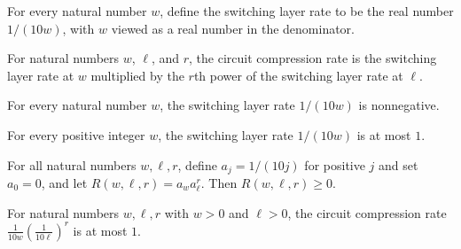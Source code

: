 \begin{definition}
\label{FABL.switchingLayerRate}
\leanok
For every natural number $w$, define the switching layer rate to be the real number
$1/(10w)$, with $w$ viewed as a real number in the denominator.
\end{definition}

\begin{definition}
\label{FABL.circuitCompressionRate}
\leanok
{}
For natural numbers $w$, $\ell$, and $r$, the circuit compression rate is the switching
layer rate at $w$ multiplied by the $r$th power of the switching layer rate at $\ell$.
\end{definition}

\begin{theorem}
\label{FABL.switchingLayerRate_nonneg}
\leanok
{}
For every natural number $w$, the switching layer rate $1/(10w)$ is nonnegative.
\end{theorem}

\begin{theorem}
\label{FABL.switchingLayerRate_le_one}
\leanok
{}
For every positive integer $w$, the switching layer rate $1/(10w)$ is at most $1$.
\end{theorem}

\begin{theorem}
\label{FABL.circuitCompressionRate_nonneg}
\leanok
{}
For all natural numbers $w,\ell,r$, define $a_j=1/(10j)$ for positive $j$ and set
$a_0=0$, and let $R(w,\ell,r)=a_w a_\ell^{r}$. Then $R(w,\ell,r)\geq 0$.
\end{theorem}

\begin{theorem}
\label{FABL.circuitCompressionRate_le_one}
\leanok
{}
For natural numbers $w,\ell,r$ with $w>0$ and $\ell>0$, the circuit compression rate
$\frac{1}{10w}\left(\frac{1}{10\ell}\right)^r$ is at most $1$.
\end{theorem}

